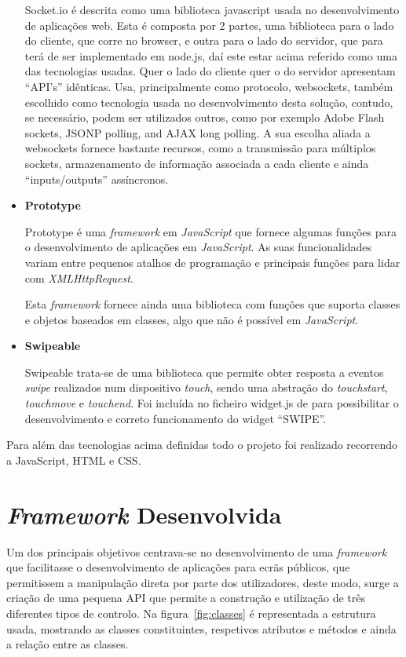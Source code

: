 \begin{itemize}
Socket.io é descrita como uma biblioteca javascript usada no desenvolvimento de aplicações web. Esta é composta por 2 partes, uma biblioteca para o lado do cliente, que corre no browser, e outra para o lado do servidor, que para terá de ser implementado em node.js, daí este estar acima referido como uma das tecnologias usadas. Quer o lado do cliente quer o do servidor apresentam “API’s” idênticas. 
Usa, principalmente como protocolo, websockets, também escolhido como tecnologia usada no desenvolvimento desta solução, contudo, se necessário, podem ser utilizados outros, como por exemplo Adobe Flash sockets, JSONP polling, and AJAX long polling. 
A sua escolha aliada a websockets fornece bastante recursos, como a transmissão para múltiplos sockets, armazenamento de informação associada a cada cliente e ainda “inputs/outputs” assíncronos. 

\item \textbf{Prototype}

Prototype é uma \textit{framework} em \textit{JavaScript} que fornece algumas funções para o desenvolvimento de aplicações em \textit{JavaScript}. As suas funcionalidades variam entre pequenos atalhos de programação e principais funções para lidar com \textit{XMLHttpRequest}.

Esta \textit{framework} fornece ainda uma biblioteca com funções que suporta classes e objetos baseados em classes, algo que não é possível em \textit{JavaScript}.

\item \textbf{Swipeable}

Swipeable trata-se de uma biblioteca que permite obter resposta a eventos \textit{swipe} realizados num dispositivo \textit{touch}, sendo uma abstração do \textit{touchstart}, \textit{touchmove} e \textit{touchend}. 
Foi incluída no ficheiro widget.js de para possibilitar o desenvolvimento e correto funcionamento do widget “SWIPE”.

\end{itemize}

Para além das tecnologias acima definidas todo o projeto foi realizado recorrendo a JavaScript, HTML e CSS. 


\section{\textit{Framework} Desenvolvida} \label{sec:framework}

Um dos principais objetivos centrava-se no desenvolvimento de uma \textit{framework} que facilitasse o desenvolvimento de aplicações para ecrãs públicos, que permitissem a manipulação direta por parte dos utilizadores, deste modo, surge a criação de uma pequena API que permite a construção e utilização de três diferentes tipos de controlo. 
Na figura~\ref{fig:classes} é representada a estrutura usada, mostrando as classes constituintes, respetivos atributos e métodos e ainda a relação entre as classes.

